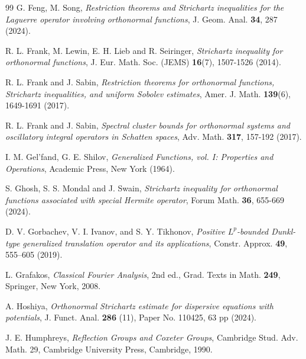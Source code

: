 \documentclass[a4paper,11pt, reqno]{amsart}
\numberwithin{equation}{section}
\theoremstyle{plain}
\theoremstyle{definition}
\theoremstyle{remark}
\begin{document}
\begin{thebibliography}{99}
\label{Feng-Song} G. Feng, M. Song, \emph{Restriction theorems and Strichartz inequalities for the Laguerre operator involving orthonormal functions}, J. Geom. Anal. \textbf{34}, 287 (2024).

\label{FLLS} R. L. Frank, M. Lewin,  E. H. Lieb and   R. Seiringer, \emph{Strichartz inequality for orthonormal functions}, J. Eur. Math. Soc. (JEMS) \textbf{16}(7), 1507-1526 (2014).
			
\label{FS} R. L. Frank and J. Sabin, \emph{Restriction theorems for orthonormal functions, Strichartz inequalities, and uniform Sobolev estimates}, Amer. J. Math. \textbf{139}(6), 1649-1691 (2017).

\label{FS1} R. L. Frank and J. Sabin, \emph{Spectral cluster bounds for orthonormal systems and oscillatory integral operators in Schatten spaces}, Adv. Math. \textbf{317}, 157-192 (2017).


            
\label{Gelfand-Shilov} I. M. Gel'fand, G. E. Shilov, \emph{Generalized Functions, vol. I: Properties and Operations}, Academic Press, New York (1964).

 S. Ghosh, S. S. Mondal and J. Swain,  \emph{Strichartz inequality for orthonormal functions associated with special Hermite operator}, Forum Math. \textbf{36}, 655-669 (2024).


 D. V. Gorbachev, V. I. Ivanov, and S. Y. Tikhonov, \emph{Positive $L^p$-bounded Dunkl-type generalized translation operator and its applications}, Constr. Approx. \textbf{49}, 555–605 (2019).

 L. Grafakos, \emph{Classical Fourier Analysis}, 2nd ed., Grad. Texts in Math. \textbf{249}, Springer, New York, 2008.


 A. Hoshiya, \emph{Orthonormal Strichartz estimate for dispersive equations with potentials}, J. Funct. Anal. \textbf{286} (11), Paper No. 110425, 63 pp (2024).

 J. E. Humphreys, \emph{Reflection Groups and Coxeter Groups}, Cambridge Stud. Adv. Math. 29, Cambridge University Press, Cambridge, 1990. 


\end{thebibliography}
\end{document}
